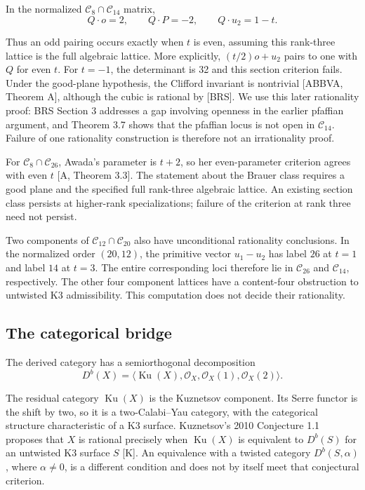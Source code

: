 \documentclass[
  american,
  11pt,
  a4paper,
]{article}
\begin{document}
In the normalized \(\mathcal C_8\cap\mathcal C_{14}\) matrix,
\[Q\cdot o=2,\qquad Q\cdot P=-2,\qquad Q\cdot u_2=1-t.\]

Thus an odd pairing occurs exactly when \(t\) is even, assuming this
rank-three lattice is the full algebraic lattice. More explicitly,
\((t/2)o+u_2\) pairs to one with \(Q\) for even \(t\). For \(t=-1\), the
determinant is 32 and this section criterion fails. Under the good-plane
hypothesis, the Clifford invariant is nontrivial {[}ABBVA, Theorem A{]},
although the cubic is rational by {[}BRS{]}. We use this later
rationality proof: BRS Section 3 addresses a gap involving openness in
the earlier pfaffian argument, and Theorem 3.7 shows that the pfaffian
locus is not open in \(\mathcal C_{14}\). Failure of one rationality
construction is therefore not an irrationality proof.

For \(\mathcal C_8\cap\mathcal C_{26}\), Awada's parameter is \(t+2\),
so her even-parameter criterion agrees with even \(t\) {[}A, Theorem
3.3{]}. The statement about the Brauer class requires a good plane and
the specified full rank-three algebraic lattice. An existing section
class persists at higher-rank specializations; failure of the criterion
at rank three need not persist.

Two components of \(\mathcal C_{12}\cap\mathcal C_{20}\) also have
unconditional rationality conclusions. In the normalized order
\((20,12)\), the primitive vector \(u_1-u_2\) has label \(26\) at
\(t=1\) and label \(14\) at \(t=3\). The entire corresponding loci
therefore lie in \(\mathcal C_{26}\) and \(\mathcal C_{14}\),
respectively. The other four component lattices have a content-four
obstruction to untwisted K3 admissibility. This computation does not
decide their rationality.

\subsection{The categorical bridge}\label{the-categorical-bridge}

The derived category has a semiorthogonal decomposition
\[D^b(X)=\langle\operatorname{Ku}(X),\mathcal O_X,\mathcal O_X(1),\mathcal O_X(2)\rangle.\]

The residual category \(\operatorname{Ku}(X)\) is the Kuznetsov
component. Its Serre functor is the shift by two, so it is a
two-Calabi--Yau category, with the categorical structure characteristic
of a K3 surface. Kuznetsov's 2010 Conjecture 1.1 proposes that \(X\) is
rational precisely when \(\operatorname{Ku}(X)\) is equivalent to
\(D^b(S)\) for an untwisted K3 surface \(S\) {[}K{]}. An equivalence
with a twisted category \(D^b(S,\alpha)\), where \(\alpha\ne0\), is a
different condition and does not by itself meet that conjectural
criterion.
\end{document}
